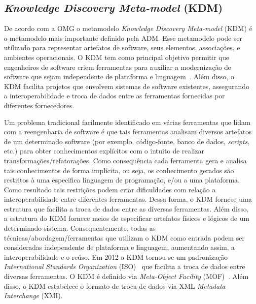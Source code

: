 \documentclass[12pt]{article}
\begin{document}
\subsection{\textit{Knowledge Discovery Meta-model} (KDM)}

De acordo com a OMG o metamodelo \textit{Knowledge Discovery Meta-model} (KDM) é o metamodelo mais importante definido pela ADM. Esse metamodelo pode ser utilizado para representar artefatos de software, seus elementos, associações, e ambientes operacionais. O KDM tem como principal objetivo permitir que engenheiros de software criem ferramentas para auxiliar a modernização de software que sejam independente de plataforma e linguagem~\cite{PerezCastillo:2011jo, ADMCHAPTERR}. Além disso, o KDM facilita projetos que envolvem sistemas de software existentes, assegurando a interoperabilidade e troca de dados entre as ferramentas fornecidas por diferentes fornecedores. 

Um problema tradicional facilmente identificado em várias ferramentas que lidam com a reengenharia de software é que tais ferramentas analisam diversos artefatos de um determinado software (por exemplo, código-fonte, banco de dados, \textit{scripts}, etc.) para obter conhecimentos explícitos com o intuito de realizar transformações/refatorações. Como consequência cada ferramenta gera e analisa tais conhecimentos de forma implícita, ou seja, os conhecimento gerados são restritos à uma especifica linguagem de programação, e/ou a uma plataforma. Como resultado tais restrições podem criar dificuldades com relação a interoperabilidade entre diferentes ferramentas. Dessa forma, o KDM fornece uma estrutura que facilita a troca de dados entre as diversas ferramentas. Além disso, a estrutura do KDM fornece meios de especificar artefatos físicos e lógicos de um determinado sistema. Consequentemente, todas as técnicas/abordagem/ferramentas que utilizam o KDM como entrada podem ser consideradas independente de plataforma e linguagem, aumentando assim, a interoperabilidade e o reúso. Em 2012 o KDM tornou-se um padronização \textit{International Standards Organization} (ISO)~\cite{KDM:specification} que facilita a troca de dados entre diversas ferramentas. O KDM é definido via \textit{Meta-Object Facility} (MOF)~\cite{MOF}. Além disso, o KDM estabelece o formato de troca de dados via XML \textit{Metadata Interchange} (XMI).
\end{document}
